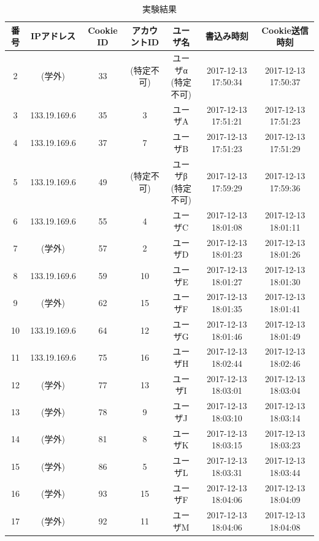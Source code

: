 \documentclass[10pt, a4paper]{jreport}
\begin{document}
\begin{table}[H]
	\caption{実験結果}
	\label{tb: exp_result}
	\begin{center}
		\scalebox{0.67} {
			\begin{tabular}{ | c | c | c | c | c | c | c | } \hline

番号 & IPアドレス & Cookie ID & アカウントID & ユーザ名 & 書込み時刻 & Cookie送信時刻 \\ \hline
2 & (学外) & 33 & (特定不可) & \shortstack{ユーザα\\(特定不可)} & 2017-12-13 17:50:34 & 2017-12-13 17:50:37 \\ \hline
3 & 133.19.169.6 & 35 & 3 & ユーザA & 2017-12-13 17:51:21 & 2017-12-13 17:51:23 \\ \hline
4 & 133.19.169.6 & 37 & 7 & ユーザB & 2017-12-13 17:51:23 & 2017-12-13 17:51:29 \\ \hline
5 & 133.19.169.6 & 49 & (特定不可) & \shortstack{ユーザβ\\(特定不可)} & 2017-12-13 17:59:29 & 2017-12-13 17:59:36 \\ \hline
6 & 133.19.169.6 & 55 & 4 & ユーザC & 2017-12-13 18:01:08 & 2017-12-13 18:01:11 \\ \hline
7 & (学外) & 57 & 2 & ユーザD & 2017-12-13 18:01:23 & 2017-12-13 18:01:26 \\ \hline
8 & 133.19.169.6 & 59 & 10 & ユーザE & 2017-12-13 18:01:27 & 2017-12-13 18:01:30 \\ \hline
9 & (学外) & 62 & 15 & ユーザF & 2017-12-13 18:01:35 & 2017-12-13 18:01:41 \\ \hline
10 & 133.19.169.6 & 64 & 12 & ユーザG & 2017-12-13 18:01:46 & 2017-12-13 18:01:49 \\ \hline
11 & 133.19.169.6 & 75 & 16 & ユーザH & 2017-12-13 18:02:44 & 2017-12-13 18:02:46 \\ \hline
12 & (学外) & 77 & 13 & ユーザI & 2017-12-13 18:03:01 & 2017-12-13 18:03:04 \\ \hline
13 & (学外) & 78 & 9 & ユーザJ & 2017-12-13 18:03:10 & 2017-12-13 18:03:14 \\ \hline
14 & (学外) & 81 & 8 & ユーザK & 2017-12-13 18:03:15 & 2017-12-13 18:03:23 \\ \hline
15 & (学外) & 86 & 5 & ユーザL & 2017-12-13 18:03:31 & 2017-12-13 18:03:44 \\ \hline
16 & (学外) & 93 & 15 & ユーザF & 2017-12-13 18:04:06 & 2017-12-13 18:04:09 \\ \hline
17 & (学外) & 92 & 11 & ユーザM & 2017-12-13 18:04:06 & 2017-12-13 18:04:08 \\ \hline

\end{tabular}}
\end{center}
\end{table}
\end{document}
